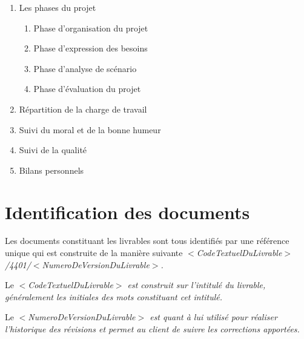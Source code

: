 \begin{enumerate}
    \item Les phases du projet
        \begin{enumerate}
            \item Phase d’organisation du projet
            \item Phase d’expression des besoins
            \item Phase d’analyse de scénario
            \item Phase d’évaluation du projet
        \end{enumerate}
    \item Répartition de la charge de travail
    \item Suivi du moral et de la bonne humeur
    \item Suivi de la qualité
    \item Bilans personnels 
\end{enumerate}

\section{Identification des documents}

Les documents constituant les livrables sont tous identifiés par  une référence unique qui est construite de la manière suivante \it{$<$CodeTextuelDuLivrable$>$}/4401/\it{$<$NumeroDeVersionDuLivrable$>$}.

Le \it{$<$CodeTextuelDuLivrable$>$} est construit sur l'intitulé du livrable, généralement les initiales des mots constituant cet intitulé. 

Le \it{$<$NumeroDeVersionDuLivrable$>$} est quant à lui utilisé pour réaliser l'historique des révisions et permet au client de suivre les corrections apportées.

